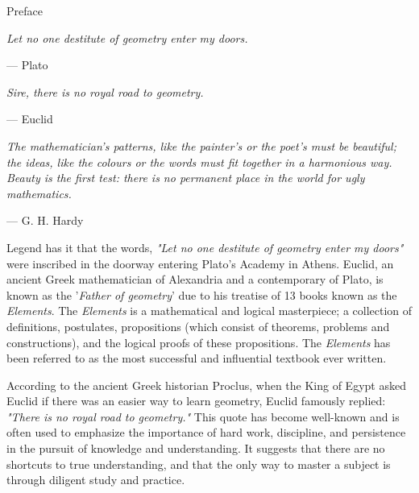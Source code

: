 \documentclass[twoside,12pt]{report}
\begin{document}
\centerline{\LARGE{Preface}}

\hfill

\normalsize %


\hspace{2em}\textit{Let no one destitute of geometry enter my doors.}

\hspace{16em} --- Plato

\hfill

\begin{center}
  \textit{Sire, there is no royal road to geometry.}

  \hspace{11em}--- Euclid
\end{center}

\hfill

\begin{flushright}
  \textit{The mathematician's patterns, like the painter's or the poet's must be beautiful;}\hspace{2em}\null\\
  \textit{the ideas, like the colours or the words must fit together in a harmonious way.}\hspace{2em}\null\\
  \hfill \textit{Beauty is the first test: there is no permanent place in the world for ugly mathematics.}\hspace{2em}\null
\end{flushright}

\hfill --- G. H. Hardy\hspace{2em}\null\\

\hfill

\hspace{\parindent} Legend has it that the words, \textit{"Let no one destitute of geometry enter my doors"} were inscribed in the doorway entering Plato's Academy in Athens.  Euclid, an ancient Greek mathematician of Alexandria and a contemporary of Plato, is known as the '\textit{Father of geometry}' due to his treatise of 13 books known as the \textit{Elements}.  The \textit{Elements} is a mathematical and logical masterpiece; a collection of definitions, postulates, propositions (which consist of theorems, problems and constructions), and the logical proofs of these propositions.  The \textit{Elements} has been referred to as the most successful and influential textbook ever written.

According to the ancient Greek historian Proclus, when the King of Egypt asked Euclid if there was an easier way to learn geometry, Euclid famously replied: \textit{"There is no royal road to geometry."} This quote has become well-known and is often used to emphasize the importance of hard work, discipline, and persistence in the pursuit of knowledge and understanding. It suggests that there are no shortcuts to true understanding, and that the only way to master a subject is through diligent study and practice.
\end{document}
